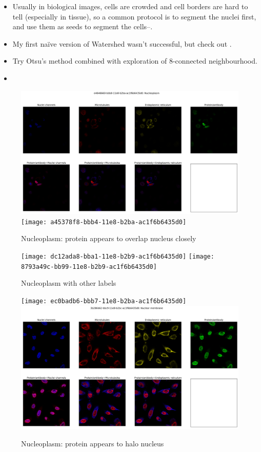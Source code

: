\documentclass[]{article}
\begin{document}
\begin{itemize}
	\item Usually in biological images, cells are crowded and cell borders are hard to tell (especially in tissue), so a common protocol is to segment the nuclei first, and use them as seeds to segment the cells--\cite{liao2021ground}.
	\item My first na\"ive version of Watershed wasn't successful, but check out \cite{najman1994watershed}.
	\item Try Otsu's method \cite{otsu1979threshold} combined with exploration of 8-connected neighbourhood.
	 \cite{win2018comparative}
	\item \cite{jo2021puzzle}
\end{itemize}

\begin{figure}
	\caption[Nucleoplasm: protein appears to overlap nucleus closely]{Nucleoplasm: protein appears to overlap nucleus closely}
	\includegraphics[width=\textwidth]{e4646660-bbb8-11e8-b2ba-ac1f6b6435d0}
	\texttt{[image: a45378f8-bbb4-11e8-b2ba-ac1f6b6435d0]}
\end{figure}

\begin{figure}
	\caption[Nucleoplasm with other labels]{Nucleoplasm with other labels}
	\texttt{[image: dc12ada8-bba1-11e8-b2b9-ac1f6b6435d0]}
	\texttt{[image: 8793a49c-bb99-11e8-b2b9-ac1f6b6435d0]}
\end{figure}

\begin{figure}
	\caption[Nuclear Membrane: protein appears to halo nucleus]{Nucleoplasm: protein appears to halo nucleus}
	\texttt{[image: ec0badb6-bbb7-11e8-b2ba-ac1f6b6435d0]}
	\includegraphics[width=\textwidth]{3b286b62-bbc9-11e8-b2bc-ac1f6b6435d0}
\end{figure}

\clearpage


\printacronyms
\printglossary



\end{document}
